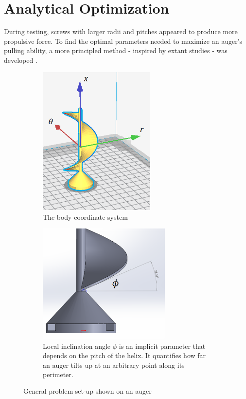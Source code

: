 \documentclass[letterpaper, 11 pt]{article}
\begin{document}
\section{Analytical Optimization}
During testing, screws with larger radii and pitches appeared to produce more propulsive force. To find the optimal parameters needed to maximize an auger's pulling ability, a more principled method - inspired by extant studies - was developed \cite{Melo,Li}.

\begin{figure}[H]
\centering
\begin{subfigure}{.5\textwidth}
	\centering
	\includegraphics[height=7.5cm]{./imgs/helix_csys}
	\caption{The body coordinate system}
	\label{fig:helix_csys}
\end{subfigure}%
\begin{subfigure}{.5\textwidth}
	\centering
	\includegraphics[height=6cm]{./imgs/helix_phi}
	\caption{Local inclination angle $\phi$ is an implicit parameter that depends on the pitch of the helix. It quantifies how far an auger tilts up at an arbitrary point along its perimeter.}
	\label{fig:helix_phi}
\end{subfigure}
\caption{General problem set-up shown on an auger}
\label{probSetup}
\end{figure}
 
\end{document}
